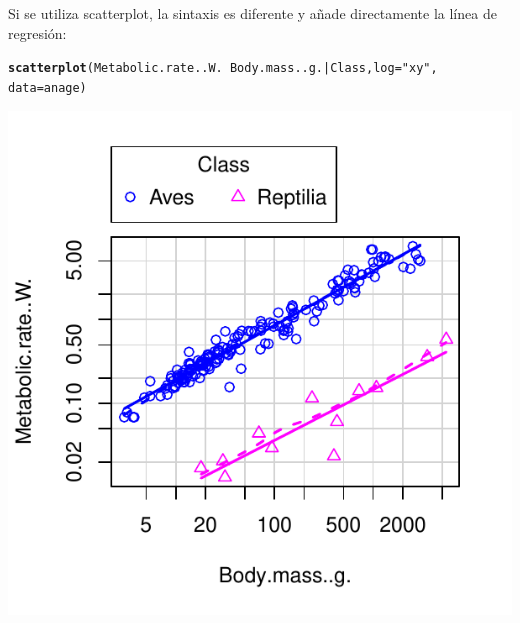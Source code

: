 \documentclass{config/apuntes}\usepackage[]{graphicx}\usepackage[]{xcolor}
\makeatletter
\def\maxwidth{ %
  \ifdim\Gin@nat@width>\linewidth
    \linewidth
  \else
    \Gin@nat@width
  \fi
}
\newcommand{\hlsng}[1]{\textcolor[rgb]{0.192,0.494,0.8}{#1}}%
\newcommand{\hlopt}[1]{\textcolor[rgb]{0,0,0}{#1}}%
\newcommand{\hldef}[1]{\textcolor[rgb]{0.345,0.345,0.345}{#1}}%
\newcommand{\hlkwc}[1]{\textcolor[rgb]{0.333,0.667,0.333}{#1}}%
\newcommand{\hlkwd}[1]{\textcolor[rgb]{0.737,0.353,0.396}{\textbf{#1}}}%
\newenvironment{kframe}{%
 \def\at@end@of@kframe{}%
 \ifinner\ifhmode%
  \def\at@end@of@kframe{\end{minipage}}%
  \begin{minipage}{\columnwidth}%
 \fi\fi%
 \def\FrameCommand##1{\hskip\@totalleftmargin \hskip-\fboxsep
 \colorbox{shadecolor}{##1}\hskip-\fboxsep
     \hskip-\linewidth \hskip-\@totalleftmargin \hskip\columnwidth}%
 \MakeFramed {\advance\hsize-\width
   \@totalleftmargin\z@ \linewidth\hsize
   \@setminipage}}%
 {\par\unskip\endMakeFramed%
 \at@end@of@kframe}
\newenvironment{knitrout}{}{} %
\makeatother
\begin{document}
Si se utiliza scatterplot, la sintaxis es diferente y añade directamente la línea de regresión:
\begin{knitrout}
\color{fgcolor}\begin{kframe}
\begin{alltt}
\hlkwd{scatterplot}\hldef{(Metabolic.rate..W.} \hlopt{~} \hldef{Body.mass..g.}\hlopt{|}\hldef{Class,} \hlkwc{log}\hldef{=}\hlsng{"xy"}\hldef{,}
            \hlkwc{data} \hldef{= anage)}
\end{alltt}
\end{kframe}
\includegraphics[width=\maxwidth]{figure/unnamed-chunk-77-1} 
\end{knitrout}
\end{document}

